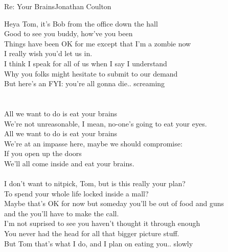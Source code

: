 \documentclass[a4paper,11pt]{article}
\begin{document}
\begin{song}{Re: Your Brains}{Jonathan Coulton}

 Heya Tom, it's Bob from the office down the hall \\
Good to see you buddy, how've you been \\
Things have been OK for me except that I'm a zombie now\\
 I really wish you'd let us in.\\
I think I speak for all of us when I say I understand\\
Why you folks might hesitate to submit to our demand\\
But here's an FYI: you're all gonna die.. screaming\\
\\
\\
All we want to do is eat your brains \\
We're not unreasonable, I mean, no-one's going to eat your eyes.\\
All we want to do is eat your brains \\
We're at an impasse here,  maybe we should compromise:\\
If you open up the doors\\
We'll all come inside and eat your brains.\\
\\
I don't want to nitpick, Tom, but is this really your plan?\\
To spend your whole life locked inside a mall? \\
Maybe that's OK for now but someday you'll be out of food and guns\\
 and the you'll have to make the call.\\
I'm not suprised to see you haven't thought it through enough\\
You never had the head for all that  bigger picture stuff.\\
But Tom that's what I do, and I plan on eating you.. slowly\\
\\

\end{song}
\end{document}
